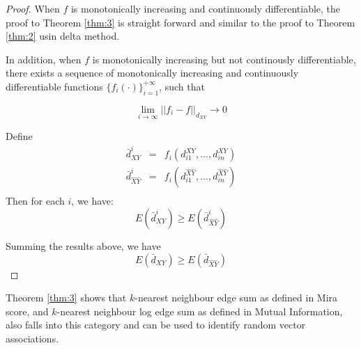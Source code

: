 \documentclass[12pt,letterpaper]{article}
\begin{document}
\begin{proof}
  When $f$ is monotonically increasing and continuously
  differentiable, the proof to Theorem \ref{thm:3} is straight forward
  and similar to the proof to Theorem \ref{thm:2} usin delta method.

  In addition, when $f$ is monotonically increasing but not
  continously differentiable, there exists a sequence of monotonically
  increasing and continuously differentiable functions
  $\{f_i(\cdot)\}_{i=1}^{+\infty}$, such that
  
  \begin{equation}
    \lim_{i \to \infty} ||f_i - f||_{d_{XY}} \to 0
  \end{equation}

  Define 
  \begin{eqnarray*}
    \bar{d}^{i}_{XY} &=& f_i(d^{XY}_{i1},\ldots,d^{XY}_{in})\\ 
    \bar{d}^{i}_{\hat{X}\hat{Y}} &=& f_i(d^{\hat{X}\hat{Y}}_{i1},\ldots,d^{\hat{X}\hat{Y}}_{in})\\
  \end{eqnarray*}
  Then for each $i$, we have:
  \begin{displaymath}
    E(\bar{d}^i_{XY}) \ge E(\bar{d}^i_{\hat{X}\hat{Y}})
  \end{displaymath}

  Summing the results above, we have 
  \begin{equation}
    E(\bar{d}_{XY}) \ge E(\bar{d}_{\hat{X}\hat{Y}})
  \end{equation}
\end{proof}

Theorem \ref{thm:3} shows that $k$-nearest neighbour edge sum as
defined in Mira score, and $k$-nearest neighbour log edge sum as
defined in Mutual Information, also falls into this category and can
be used to identify random vector associations. 




\end{document}
